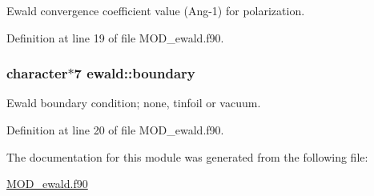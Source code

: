 Ewald convergence coefficient value (Ang-\/1) for polarization. 



Definition at line 19 of file M\-O\-D\-\_\-ewald.\-f90.

\hypertarget{classewald_ad3dc914487ee77252267f5294ed6b19f}{
\subsubsection[{boundary}]{\setlength{\rightskip}{0pt plus 5cm}character$\ast$7 ewald\-::boundary}}\label{classewald_ad3dc914487ee77252267f5294ed6b19f}


Ewald boundary condition; none, tinfoil or vacuum. 



Definition at line 20 of file M\-O\-D\-\_\-ewald.\-f90.



The documentation for this module was generated from the following file\-:\begin{DoxyCompactItemize}
\item 
\hyperlink{MOD__ewald_8f90}{M\-O\-D\-\_\-ewald.\-f90}\end{DoxyCompactItemize}
